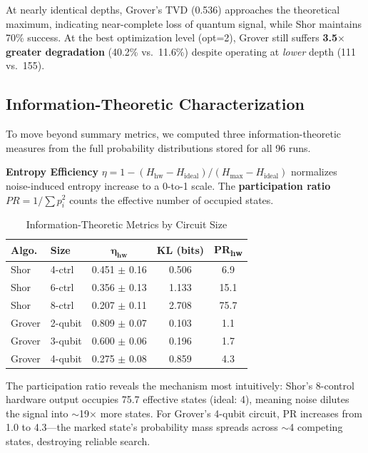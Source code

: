 \documentclass[conference]{IEEEtran}
\begin{document}
At nearly identical depths, Grover's TVD (0.536) approaches the theoretical maximum, indicating near-complete loss of quantum signal, while Shor maintains 70\% success. At the best optimization level (opt=2), Grover still suffers \textbf{3.5$\times$ greater degradation} (40.2\% vs.\ 11.6\%) despite operating at \emph{lower} depth (111 vs.\ 155).

\subsection{Information-Theoretic Characterization}

To move beyond summary metrics, we computed three information-theoretic measures from the full probability distributions stored for all 96 runs.

\textbf{Entropy Efficiency} $\eta = 1 - (H_{\text{hw}} - H_{\text{ideal}}) / (H_{\text{max}} - H_{\text{ideal}})$ normalizes noise-induced entropy increase to a 0-to-1 scale. The \textbf{participation ratio} $PR = 1/\sum p_i^2$ counts the effective number of occupied states.

\begin{table}[htbp]
\caption{Information-Theoretic Metrics by Circuit Size}
\begin{center}
\begin{tabular}{llccc}
\toprule
\textbf{Algo.} & \textbf{Size} & $\boldsymbol{\eta_{\textbf{hw}}}$ & \textbf{KL (bits)} & \textbf{PR\textsubscript{hw}} \\
\midrule
Shor & 4-ctrl & 0.451 $\pm$ 0.16 & 0.506 & 6.9 \\
Shor & 6-ctrl & 0.356 $\pm$ 0.13 & 1.133 & 15.1 \\
Shor & 8-ctrl & 0.207 $\pm$ 0.11 & 2.708 & 75.7 \\
\midrule
Grover & 2-qubit & 0.809 $\pm$ 0.07 & 0.103 & 1.1 \\
Grover & 3-qubit & 0.600 $\pm$ 0.06 & 0.196 & 1.7 \\
Grover & 4-qubit & 0.275 $\pm$ 0.08 & 0.859 & 4.3 \\
\bottomrule
\end{tabular}
\label{tab:info}
\end{center}
\end{table}

The participation ratio reveals the mechanism most intuitively: Shor's 8-control hardware output occupies 75.7 effective states (ideal: 4), meaning noise dilutes the signal into $\sim$19$\times$ more states. For Grover's 4-qubit circuit, PR increases from 1.0 to 4.3---the marked state's probability mass spreads across $\sim$4 competing states, destroying reliable search.
\end{document}
